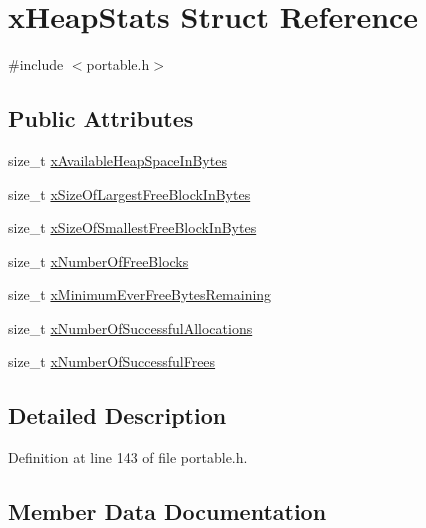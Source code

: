 \hypertarget{structx_heap_stats}{}\section{x\+Heap\+Stats Struct Reference}
\label{structx_heap_stats}


{\ttfamily \#include $<$portable.\+h$>$}

\subsection*{Public Attributes}
\begin{DoxyCompactItemize}
\item 
size\+\_\+t \hyperlink{structx_heap_stats_a7641b3a1494c093b3fe92a511419e36f}{x\+Available\+Heap\+Space\+In\+Bytes}
\item 
size\+\_\+t \hyperlink{structx_heap_stats_aaaf136c838775162f7f9d8218ee0ba06}{x\+Size\+Of\+Largest\+Free\+Block\+In\+Bytes}
\item 
size\+\_\+t \hyperlink{structx_heap_stats_af881dc708d82b808ad78fce2cc318af7}{x\+Size\+Of\+Smallest\+Free\+Block\+In\+Bytes}
\item 
size\+\_\+t \hyperlink{structx_heap_stats_af66da4ca5a39e1ae32edca5896e056ce}{x\+Number\+Of\+Free\+Blocks}
\item 
size\+\_\+t \hyperlink{structx_heap_stats_a2ef01d960466f5cba4d61c61723118e7}{x\+Minimum\+Ever\+Free\+Bytes\+Remaining}
\item 
size\+\_\+t \hyperlink{structx_heap_stats_a0474041a978f26b0ac0e721689a7c8db}{x\+Number\+Of\+Successful\+Allocations}
\item 
size\+\_\+t \hyperlink{structx_heap_stats_a2a11579b572a1bd744b22f418b00279d}{x\+Number\+Of\+Successful\+Frees}
\end{DoxyCompactItemize}


\subsection{Detailed Description}


Definition at line 143 of file portable.\+h.



\subsection{Member Data Documentation}
\mbox{\label{structx_heap_stats_a7641b3a1494c093b3fe92a511419e36f}} 
